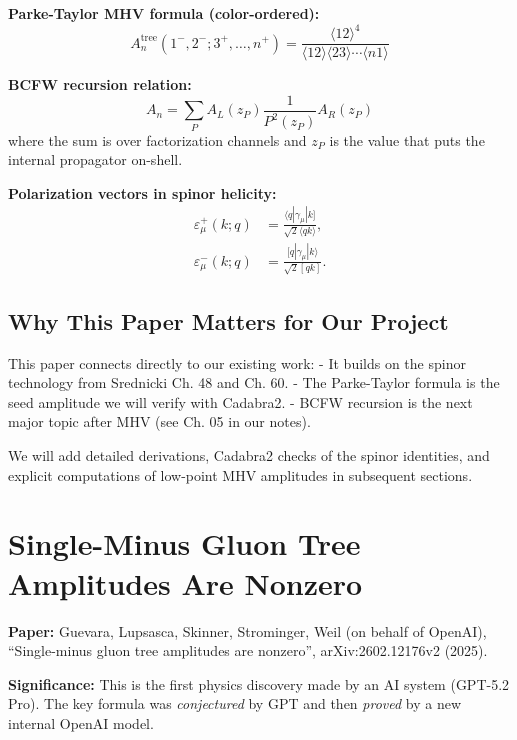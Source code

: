 \textbf{Parke-Taylor MHV formula (color-ordered):}
\begin{equation}
A_n^{\text{tree}}(1^-,2^-;3^+,\dots,n^+) = \frac{\langle 1 2 \rangle^4}{\langle 1 2 \rangle \langle 2 3 \rangle \cdots \langle n 1 \rangle}
\label{eq:parke-taylor}
\end{equation}

\textbf{BCFW recursion relation:}
\begin{equation}
A_n = \sum_{P} A_L(z_P) \frac{1}{P^2(z_P)} A_R(z_P)
\label{eq:bcfw}
\end{equation}
where the sum is over factorization channels and $z_P$ is the value that puts the internal propagator on-shell.

\textbf{Polarization vectors in spinor helicity:}
\begin{align}
\varepsilon^+_\mu(k;q) &= \frac{\langle q | \gamma_\mu | k ]}{\sqrt{2} \langle q k \rangle}, \\
\varepsilon^-_\mu(k;q) &= \frac{[q | \gamma_\mu | k \rangle}{\sqrt{2} [q k ]}.
\end{align}

\subsection{Why This Paper Matters for Our Project}

This paper connects directly to our existing work:
- It builds on the spinor technology from Srednicki Ch. 48 and Ch. 60.
- The Parke-Taylor formula is the seed amplitude we will verify with Cadabra2.
- BCFW recursion is the next major topic after MHV (see Ch. 05 in our notes).

We will add detailed derivations, Cadabra2 checks of the spinor identities, and explicit computations of low-point MHV amplitudes in subsequent sections.

\newpage

\section{Single-Minus Gluon Tree Amplitudes Are Nonzero}
\label{sec:smga-2025}

\textbf{Paper:} Guevara, Lupsasca, Skinner, Strominger, Weil (on behalf of OpenAI), ``Single-minus gluon tree amplitudes are nonzero'', arXiv:2602.12176v2 (2025).

\textbf{Significance:} This is the first physics discovery made by an AI system (GPT-5.2 Pro). The key formula was \emph{conjectured} by GPT and then \emph{proved} by a new internal OpenAI model.

